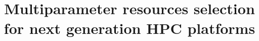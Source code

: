 \documentclass[conference]{IEEEtran}
\begin{document}
%
\title{Multiparameter resources selection for next generation HPC platforms}


\author{
\\
~~~~~~~~~~~~~~~~~~~~~~~~~~~~~~~~~~~~~~~~~
\and
{}
\\
~~~~~~~~~~~~~~~~~~~~~~~~~~~~~~~~~~~~~~~~~~~~

}
\maketitle


\newcommand{\JS}[1]{\textcolor{blue}{[JS: #1]}}
\newcommand{\TI}[1]{\textcolor{red}{[TI: #1]}}
\newcommand{\RS}[1]{\textcolor{cyan}{[RS: #1]}}
\newcommand{\D}[1]{\textcolor{violet}{[DH: #1]}}
\newcommand{\RED}[1]{\textcolor{red}{[ #1]}}
\newcommand{\YG}[1]{\textcolor{orange}{[ #1]}}

\newcommand{\figref}[1]{Figure~\ref{#1}}

\newcommand{\tabref}[1]{Table~\ref{#1}}

\newcommand{\secref}[1]{Section~\ref{#1}}

\newcommand{\todo}[1]{\textbf{\textit{TODO: {#1}}}}

\renewcommand{\bottomfraction}{.5}

\setlength{\itemsep}{-2pt}

\begin{abstract}



\end{abstract}

%
\IEEEpeerreviewmaketitle
\end{document}
